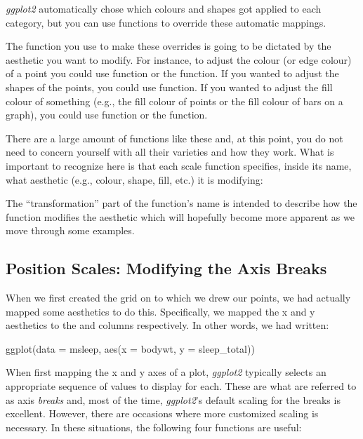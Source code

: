 \noindent
\textit{ggplot2} automatically chose which colours and shapes got applied to each category, but you can use functions to override these automatic mappings. 

The function you use to make these overrides is going to be dictated by the aesthetic you want to modify. For instance, to adjust the colour (or edge colour) of a point you could use  function or the  function. If you wanted to adjust the shapes of the points, you could use  function.  If you wanted to adjust the fill colour of something (e.g., the fill colour of points or the fill colour of bars on a graph), you could use  function or the  function.

There are a large amount of functions like these and, at this point, you do not need to concern yourself with all their varieties and how they work. What is important to recognize here is that each scale function specifies, inside its name, what aesthetic (e.g., colour, shape, fill, etc.) it is modifying:

\begin{center}
\end{center}

The ``transformation'' part of the function's name is intended to describe how the function modifies the aesthetic which will hopefully become more apparent as we move through some examples.

\subsection{Position Scales: Modifying the Axis Breaks}
\label{sec:pos_scale}

When we first created the grid on to which we drew our points, we had actually mapped some aesthetics to do this. Specifically, we mapped the x and y aesthetics to the  and  columns respectively. In other words, we had written:

\begin{inR}
ggplot(data = msleep, aes(x = bodywt, y = sleep_total))
\end{inR}

\vspace{1em}

When first mapping the x and y axes of a plot, \textit{ggplot2} typically selects an appropriate sequence of values to display for each. These are what are referred to as axis \textit{breaks} and, most of the time, \textit{ggplot2}'s default scaling for the breaks is excellent. However, there are occasions where more customized scaling is necessary. In these situations, the following four functions are useful:

